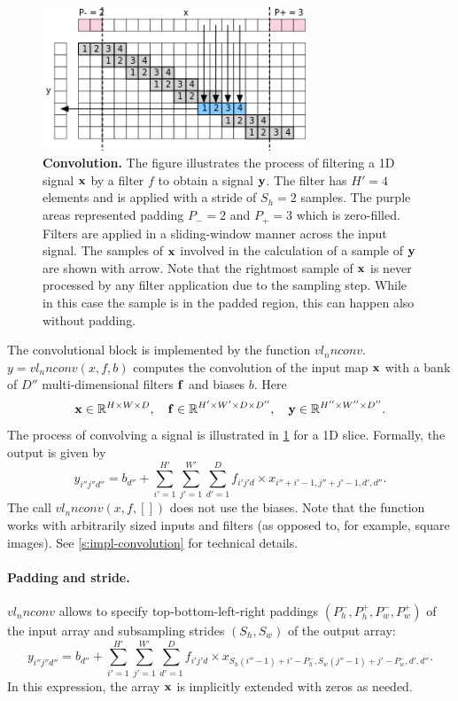 \begin{figure}[H]
	\centering
	\includegraphics[width=0.7\textwidth]{figures/svg/conv}
	\caption{\textbf{Convolution.} The figure illustrates the process of filtering a 1D signal $\mathbf{x}$ by a filter $f$ to obtain a signal $\mathbf{y}$. The filter has $H'=4$ elements and is applied with a stride of $S_h =2$ samples. The purple areas represented padding $P_-=2$ and $P_+=3$ which is zero-filled. Filters are applied in a sliding-window manner across the input signal. The samples of $\mathbf{x}$ involved in the calculation of a sample of $\mathbf{y}$ are shown with arrow. Note that the rightmost sample of $\mathbf{x}$  is never processed by any filter application due to the sampling step. While in this case the sample is in the padded region, this can happen also without padding.}\label{f:conv}
\end{figure}

The convolutional block is implemented by the function $vl_nnconv$. $y=vl_nnconv(x,f,b)$ computes the convolution of the input map $\mathbf{x}$ with a bank of $D''$ multi-dimensional filters $\mathbf{f}$ and biases $b$. Here
\[
\mathbf{x}\in\mathbb{R}^{H \times W \times D}, \quad
\mathbf{f}\in\mathbb{R}^{H' \times W' \times D \times D''}, \quad
\mathbf{y}\in\mathbb{R}^{H'' \times W'' \times D''}.
\]
The process of convolving a signal is illustrated in \cref{f:conv} for a 1D slice. Formally, the output is given by
\[
y_{i''j''d''}
=
b_{d''}
+
\sum_{i'=1}^{H'}
\sum_{j'=1}^{W'}
\sum_{d'=1}^D
f_{i'j'd} \times x_{i''+i'-1,j''+j'-1,d',d''}.
\]
The call $vl_nnconv(x,f,[])$ does not use the biases. Note that the function works with arbitrarily sized inputs and filters (as opposed to, for example, square images). See \cref{s:impl-convolution} for technical details.

\paragraph{Padding and stride.} $vl_nnconv$ allows to specify  top-bottom-left-right paddings $(P_h^-,P_h^+,P_w^-,P_w^+)$ of the input array and subsampling strides $(S_h,S_w)$ of the output array:
\[
y_{i''j''d''}
=
b_{d''}
+
\sum_{i'=1}^{H'}
\sum_{j'=1}^{W'}
\sum_{d'=1}^D
f_{i'j'd} \times x_{S_h (i''-1)+i'-P_h^-, S_w(j''-1)+j' - P_w^-,d',d''}.
\]
In this expression, the array $\mathbf{x}$ is implicitly extended with zeros as needed.

